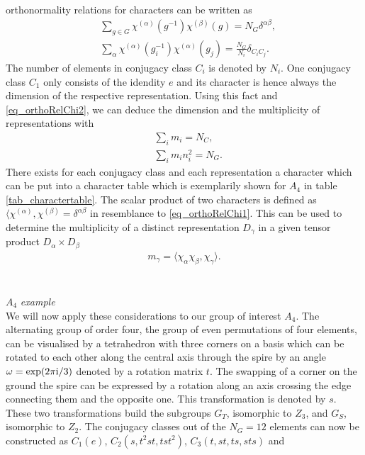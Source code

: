 orthonormality relations for characters can be written as
\begin{align}
 &\sum\limits_{g\in G} \chi^{(\alpha)}(g^{-1})\chi^{(\beta)}(g) = N_G \delta^{\alpha\beta},\label{eq_orthoRelChi1}\\
 &\sum\limits_\alpha \chi^{(\alpha)}(g^{-1}_i)\chi^{(\alpha)}(g_j) = \frac{N_G}{N_i} \delta_{C_iC_j}.
 \label{eq_orthoRelChi2}
\end{align}
The number of elements in conjugacy class $C_i$ is denoted by $N_i$. One conjugacy class $C_1$ only consists of the idendity $e$ and its character 
is hence always the dimension of the respective representation. Using this fact and \eqref{eq_orthoRelChi2}, we can deduce the dimension and the
multiplicity of representations with 
\begin{align}
 &\sum\limits_i m_i = N_C,\label{eq_multi1}\\
 &\sum\limits_i m_i n_i ^2 = N_G.\label{eq_multi2}
\end{align}
There exists for each conjugacy class and each representation a character which can be put into a character table which is exemplarily shown
for $A_4$ in table \ref{tab_charactertable}. The scalar product of two characters is defined as 
$\langle \chi^{(\alpha)},\chi^{(\beta)}=\delta^{\alpha\beta}$ in resemblance to \eqref{eq_orthoRelChi1}. This can be used to determine 
the multiplicity of a distinct representation $D_\gamma$ in a given tensor product $D_\alpha\times D_\beta$ \cite{1273369} 
\begin{align}
 m_\gamma = \langle \chi_\alpha \chi_\beta,\chi_\gamma\rangle.
 \label{eq_multiplicity}
\end{align}
\\ \\ $A_4$ \textit{ example}\\
\noindent We will now apply these considerations to our group of interest $A_4$. 
The alternating group of order four, the group of even permutations of four elements, 
can be visualised by a tetrahedron with three corners on a basis which can be rotated to each other
along the central axis through the spire by an angle $\omega=\exp(2\pi\text{i}/3)$ denoted by a rotation matrix $t$. The swapping of a corner on the ground
the spire can be expressed by a rotation along an axis crossing the edge connecting them and the opposite one. This transformation is denoted by 
$s$. These two transformations build the subgroups $G_T$, isomorphic to $Z_3$, and $G_S$, isomorphic to $Z_2$\cite{0512103}. The conjugacy classes out of the $N_G=12$ elements can now be constructed as $C_1(e)$, $C_2(s,t^2st,tst^2)$, $C_3(t,st,ts,sts)$ and 
